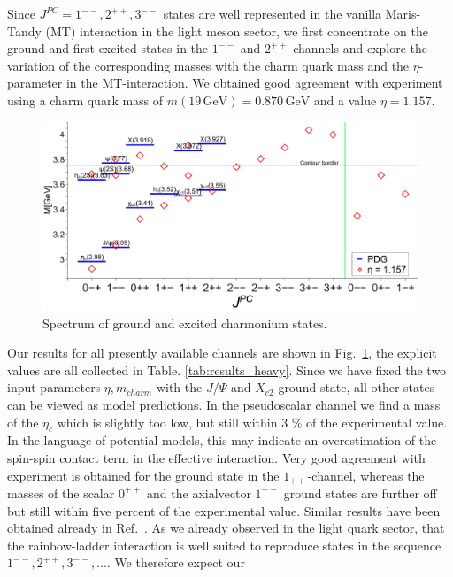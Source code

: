 Since $J^{PC}=1^{--},2^{++},3^{--}$ states are well represented in the vanilla
Maris-Tandy (MT) interaction in the light meson sector, we first concentrate
on the ground and first excited states in the $1^{--}$ and $2^{++}$-channels
and explore the variation of the corresponding masses with the charm quark
mass and the $\eta$-parameter in the MT-interaction. We obtained good
agreement with experiment using a charm quark mass of 
$m(19 \,\mbox{GeV}) = 0.870 \,\mbox{GeV}$ and a value $\eta=1.157$.
\begin{figure}[h]
  \begin{center}
  \includegraphics[width=0.999\textwidth]{figures/spectrum_cc}
  \caption{Spectrum of ground and excited charmonium states.}
  \label{fig:charm}
  \end{center}
\end{figure}
Our results for all presently available channels are shown in Fig.~\ref{fig:charm},
the explicit values are all collected in Table. \ref{tab:results_heavy}.
Since we have fixed the two input parameters $\eta,m_{charm}$ with the $J/\Psi$ and $X_{c2}$ ground 
state, all other states can be viewed as model predictions. In the pseudoscalar channel
we find a mass of the $\eta_c$ which is slightly too low, but still within 3 \% of 
the experimental value. In the language of potential models, this may indicate an 
overestimation of the spin-spin contact term in the effective interaction. Very good 
agreement with experiment is obtained for the ground state in the $1_{++}$-channel, 
whereas the masses of the scalar $0^{++}$ and the axialvector $1^{+-}$ ground states are further 
off but still within five percent of the experimental value. Similar results have
been obtained already in Ref.~\cite{Blank:2011ha,Hilger:2014nma}. As we already observed in the light quark sector, that the rainbow-ladder interaction
is well suited to reproduce states in the sequence $1^{--}, 2^{++}, 3^{--},...$. We therefore expect our 
